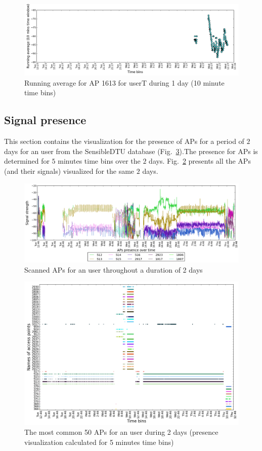 \begin{figure}[!h]
\centering
\includegraphics[width
=\textwidth]{figures/rn_avg/user_1_sorted_1days_plot_1613_rn_avg_sig_10.png}
\caption{Running average for AP 1613 for userT during 1 day (10 minute time
bins)}
\label{user_1_AP1613_rn10avg_1d_A}
\end{figure}

\subsection{Signal presence}
\label{appendix_pres}
This section contains the visualization for the presence of APs for a period of
$2$ days for an user from the SensibleDTU database
(Fig.~\ref{user_3_pres_2d_A}).The presence for APs is determined for $5$ minutes
time bins over the $2$ days.
Fig.~\ref{user_3_APs_2d_A} presents all the APs (and their signals) visualized
for the same $2$ days.

\begin{figure}[!h]
\centering
\includegraphics[width
=\textwidth]{figures/presence/user_3_sorted_2days_plot.png}
\caption{Scanned APs for an user throughout a duration of 2 days}
\label{user_3_APs_2d_A}
\end{figure}

\begin{figure}[!h]
\centering
\includegraphics[width=1\textwidth]{figures/presence/user_3_sorted_2days_no_rssi_plot.png}
\caption{The most common 50 APs for an user during 2 days (presence
visualization calculated for 5 minutes time bins)}
\label{user_3_pres_2d_A}
\end{figure}